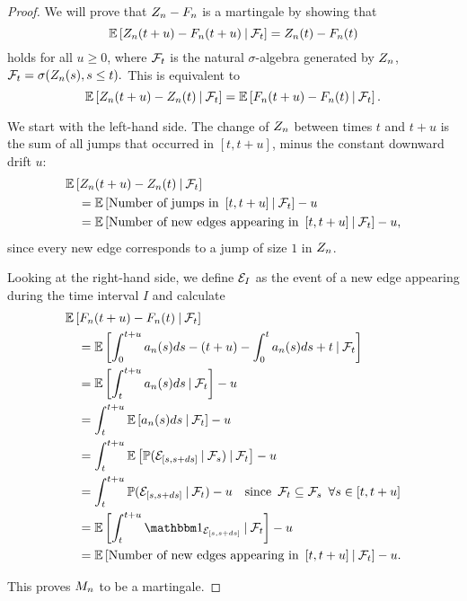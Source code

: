\begin{proof} \label{P: decomp Zn}
	We will prove that $Z_n - F_n$ is a martingale by showing that
	\begin{equation} \label{E: Mn martingale}
	\mathbb{E} \left[  Z_n(t+u) - F_n(t+u) \: | \: \mathcal{F}_{t}  \right] = Z_n(t) - F_n(t)
	\end{equation}
	holds for all $u \geq 0$, where $\mathcal{F}_{t}$ is the natural $\sigma$-algebra generated by $Z_n$, 
	$\mathcal{F}_{t} = \sigma(Z_n(s), s \leq t).$
	This is equivalent to 
	\begin{equation}
	\mathbb{E} \left[ Z_n(t+u) - Z_n(t) \: | \: \mathcal{F}_{t} \right] = \mathbb{E} \left[ F_n(t+u) - F_n(t) \: | \: \mathcal{F}_{t} \right].
	\end{equation}
	
	We start with the left-hand side. 
	The change of $Z_n$ between times $t$ and $t+u$ is the sum of all jumps that occurred in $[t, t+u]$,
	minus the constant downward drift $u$:
	\begin{align*}
	&\mathbb{E} \left[ Z_n(t+u) - Z_n(t) \: | \: \mathcal{F}_{t} \right] \\
	&\quad= \mathbb{E} \left[ \text{Number of jumps in} \enspace [t, t+u] \: | \: \mathcal{F}_{t} \right] - u \\
	&\quad= \mathbb{E} \left[ \text{Number of new edges appearing in} \enspace [t, t+u] \: | \: \mathcal{F}_{t} \right] - u,
	\end{align*}
	since every new edge corresponds to a jump of size $1$ in $Z_n$.
	
	Looking at the right-hand side, we define $\mathcal{E}_{I}$ as the event of a new edge appearing during the time interval $I$ and calculate
	\begin{align*}
	&\ExpBig{\An(t+u) - \An(t) \cond \F{t}} \\
	&\quad= \ExpBig{ \int_{0}^{t+u} a_n(s)ds - (t+u) - \int_{0}^{t} a_n(s)ds + t \cond \F{t} } \\
	&\quad= \ExpBig{ \int_{t}^{t+u} a_n(s)ds \cond \F{t} } - u \\
	&\quad= \int_{t}^{t+u} \ExpBig{a_n(s)ds \cond \F{t}} - u \\
	&\quad= \int_{t}^{t+u} \ExpBig{ \Prob(\NewEdge{\sds} \cond \F{s}) \cond \F{t} } - u\\
	&\quad= \int_{t}^{t+u} \Prob( \NewEdge{\sds} \cond \F{t} ) - u
	\quad \text{since} \enspace \F{t} \subseteq \F{s} \enspace \forall s \in [t,t+u] \\
	&\quad= \ExpBig{ \int_{t}^{t+u}  \Ind{\NewEdge{\sds}} \cond \F{t}} -u \\
	&\quad= \ExpBig{\text{Number of new edges appearing in} \enspace [t, t+u] \cond \F{t}} - u.
	\end{align*}
	
	
	This proves $M_n$ to be a martingale. 	
\end{proof}

